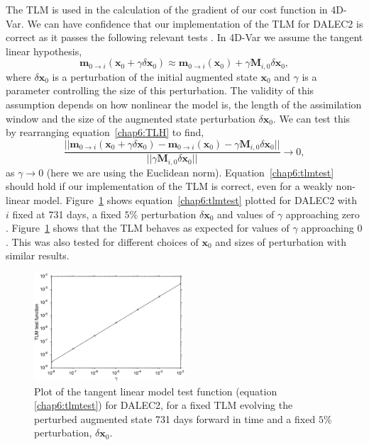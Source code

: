 The TLM is used in the calculation of the gradient of our cost function in 4D-Var. We can have confidence that our implementation of the TLM for DALEC2 is correct as it passes the following relevant tests \citep{Li1994}. In 4D-Var we assume the tangent linear hypothesis,
\begin{equation}
\textbf{m}_{0\rightarrow i}(\mathbf{x}_0+\gamma \delta\mathbf{x}_0) \approx \textbf{m}_{0 \rightarrow i}(\mathbf{x}_0) +\gamma \mathbf{M}_{i,0} \delta\mathbf{x}_0, \label{chap6:TLH}
\end{equation}
where $\delta\mathbf{x}_0$ is a perturbation of the initial augmented state $\textbf{x}_{0}$ and $\gamma$ is a parameter controlling the size of this perturbation. The validity of this assumption depends on how nonlinear the model is, the length of the assimilation window and the size of the augmented state perturbation $\delta\mathbf{x}_0$. We can test this by rearranging equation~\eqref{chap6:TLH} to find,
\begin{equation}
\frac{||\textbf{m}_{0\rightarrow i}(\mathbf{x}_0+\gamma \delta\mathbf{x}_0) - \textbf{m}_{0 \rightarrow i}(\mathbf{x}_0)-\gamma\mathbf{M}_{i,0}\delta\mathbf{x}_0||}{||\gamma\mathbf{M}_{i,0}\delta\mathbf{x}_0||} \rightarrow 0, \label{chap6:tlmtest}
\end{equation}
as $\gamma \rightarrow 0$ (here we are using the Euclidean norm). Equation~\eqref{chap6:tlmtest} should hold if our implementation of the TLM is correct, even for a weakly non-linear model. Figure~\ref{chap6:fig:tlm} shows equation~\eqref{chap6:tlmtest} plotted for DALEC2 with $i$ fixed at 731 days, a fixed $5\%$ perturbation $\delta\mathbf{x}_0$ and values of $\gamma$ approaching zero . Figure~\ref{chap6:fig:tlm} shows that the TLM behaves as expected for values of $\gamma$ approaching $0$. This was also tested for different choices of $\textbf{x}_{0}$ and sizes of perturbation with similar results.


\begin{figure}[ht]
    \centering
    \includegraphics[width=0.5\textwidth]{chapter/chapter6/linmoderr.eps}
    \caption{Plot of the tangent linear model test function (equation \eqref{chap6:tlmtest}) for DALEC2, for a fixed TLM evolving the perturbed augmented state 731 days forward in time and a fixed $5\%$ perturbation, $\delta \textbf{x}_0$.}
    \label{chap6:fig:tlm}
\end{figure}

